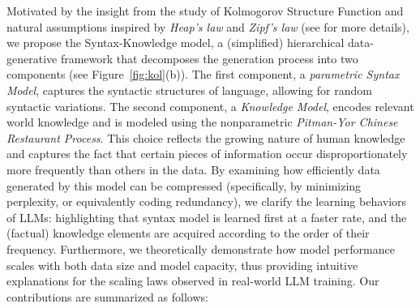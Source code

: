 \documentclass[11pt]{article}
\theoremstyle{plain}
\theoremstyle{definition}
\begin{document}
Motivated by the insight from the study of Kolmogorov Structure Function and natural assumptions inspired by {\em Heap’s law} \citep{heaps1978information} 
and {\em Zipf’s law} \citep{zipf2013psycho,zipf2016human}
(see  for more details), 
we propose the Syntax-Knowledge model, a (simplified) hierarchical data-generative framework that decomposes the generation process into two components (see Figure~\ref{fig:kol}(b)). The first component, a {\em parametric Syntax Model}, captures the syntactic structures of language, allowing for random syntactic variations. The second component, a {\em  Knowledge Model}, encodes relevant world knowledge and is modeled using the nonparametric {\em Pitman-Yor Chinese Restaurant Process}. This choice reflects the growing nature of human knowledge and captures the fact that certain pieces of information occur disproportionately more frequently than others in the data. By examining how efficiently data generated by this model can be compressed (specifically, by minimizing perplexity, or equivalently coding redundancy), we clarify the learning behaviors of LLMs: highlighting that syntax model is learned first at a faster rate, and the (factual) knowledge elements are acquired according to the order of their frequency. Furthermore, we theoretically demonstrate how model performance scales with both data size and model capacity, thus providing intuitive explanations for the scaling laws observed in real-world LLM training.
Our contributions are summarized as follows:
\end{document}
